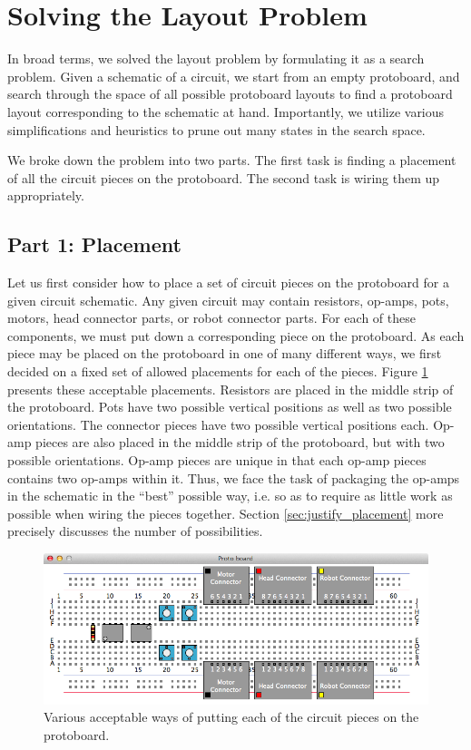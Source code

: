 \section{Solving the Layout Problem}

In broad terms, we solved the layout problem by formulating it as a search
problem. Given a schematic of a circuit, we start from an empty
protoboard, and search through the space of all possible protoboard layouts to
find a protoboard layout corresponding to the schematic at hand. Importantly, we
utilize various simplifications and heuristics to prune out many states in the
search space.

We broke down the problem into two parts. The first task is finding a placement
of all the circuit pieces on the protoboard. The second task is wiring them up
appropriately.

\subsection{Part 1: Placement}
\label{sec:placement}

Let us first consider how to place a set of circuit pieces on the protoboard for
a given circuit schematic. Any given circuit may contain resistors, op-amps,
pots, motors, head connector parts, or robot connector parts. For each of these
components, we must put down a corresponding piece on the protoboard. As each
piece may be placed on the protoboard in one of many different ways, we first
decided on a fixed set of allowed placements for each of the pieces. Figure
\ref{fig:piece_placement} presents these acceptable placements.
Resistors are placed in the middle strip of the protoboard.
Pots have two possible vertical positions as well as two possible orientations.
The connector pieces have two possible vertical positions each.
Op-amp pieces are also placed in the middle strip of the protoboard, but with
two possible orientations. Op-amp pieces are unique in that each op-amp pieces
contains two op-amps within it. Thus, we face the task of packaging the op-amps
in the schematic in the ``best'' possible way, i.e. so as to require as little
work as possible when wiring the pieces together. Section
\ref{sec:justify_placement} more precisely discusses the number of possibilities.

\begin{figure}
\begin{center}
\includegraphics[width=\linewidth]{Images/piece_placement_options.png}
\caption{Various acceptable ways of putting each of the circuit pieces on the
protoboard.}
\label{fig:piece_placement}
\end{center}
\end{figure}

